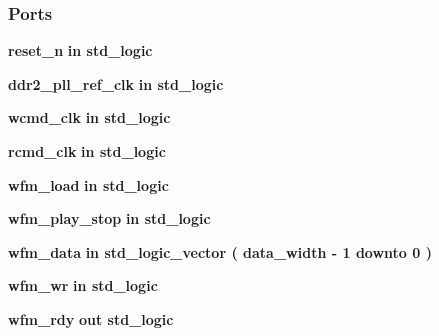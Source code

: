 \subsubsection*{Ports}
 \begin{DoxyCompactItemize}
\item 
{\bf reset\+\_\+n}  {\bfseries {\bfseries \textcolor{keywordflow}{in}\textcolor{vhdlchar}{ }}} {\bfseries \textcolor{comment}{std\+\_\+logic}\textcolor{vhdlchar}{ }} 
\item 
{\bf ddr2\+\_\+pll\+\_\+ref\+\_\+clk}  {\bfseries {\bfseries \textcolor{keywordflow}{in}\textcolor{vhdlchar}{ }}} {\bfseries \textcolor{comment}{std\+\_\+logic}\textcolor{vhdlchar}{ }} 
\item 
{\bf wcmd\+\_\+clk}  {\bfseries {\bfseries \textcolor{keywordflow}{in}\textcolor{vhdlchar}{ }}} {\bfseries \textcolor{comment}{std\+\_\+logic}\textcolor{vhdlchar}{ }} 
\item 
{\bf rcmd\+\_\+clk}  {\bfseries {\bfseries \textcolor{keywordflow}{in}\textcolor{vhdlchar}{ }}} {\bfseries \textcolor{comment}{std\+\_\+logic}\textcolor{vhdlchar}{ }} 
\item 
{\bf wfm\+\_\+load}  {\bfseries {\bfseries \textcolor{keywordflow}{in}\textcolor{vhdlchar}{ }}} {\bfseries \textcolor{comment}{std\+\_\+logic}\textcolor{vhdlchar}{ }} 
\item 
{\bf wfm\+\_\+play\+\_\+stop}  {\bfseries {\bfseries \textcolor{keywordflow}{in}\textcolor{vhdlchar}{ }}} {\bfseries \textcolor{comment}{std\+\_\+logic}\textcolor{vhdlchar}{ }} 
\item 
{\bf wfm\+\_\+data}  {\bfseries {\bfseries \textcolor{keywordflow}{in}\textcolor{vhdlchar}{ }}} {\bfseries \textcolor{comment}{std\+\_\+logic\+\_\+vector}\textcolor{vhdlchar}{ }\textcolor{vhdlchar}{(}\textcolor{vhdlchar}{ }\textcolor{vhdlchar}{ }\textcolor{vhdlchar}{ }\textcolor{vhdlchar}{ }{\bfseries {\bf data\+\_\+width}} \textcolor{vhdlchar}{-\/}\textcolor{vhdlchar}{ } \textcolor{vhdldigit}{1} \textcolor{vhdlchar}{ }\textcolor{keywordflow}{downto}\textcolor{vhdlchar}{ }\textcolor{vhdlchar}{ } \textcolor{vhdldigit}{0} \textcolor{vhdlchar}{ }\textcolor{vhdlchar}{)}\textcolor{vhdlchar}{ }} 
\item 
{\bf wfm\+\_\+wr}  {\bfseries {\bfseries \textcolor{keywordflow}{in}\textcolor{vhdlchar}{ }}} {\bfseries \textcolor{comment}{std\+\_\+logic}\textcolor{vhdlchar}{ }} 
\item 
{\bf wfm\+\_\+rdy}  {\bfseries {\bfseries \textcolor{keywordflow}{out}\textcolor{vhdlchar}{ }}} {\bfseries \textcolor{comment}{std\+\_\+logic}\textcolor{vhdlchar}{ }} 

\end{DoxyCompactItemize}
